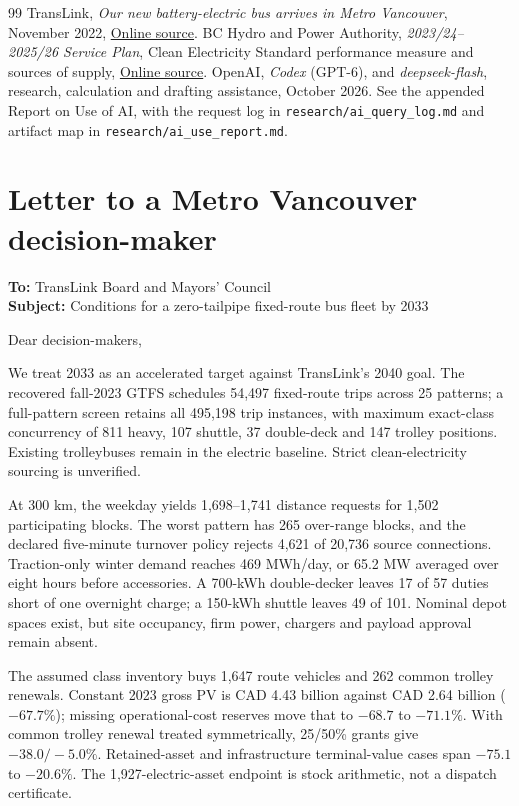 \documentclass[12pt,letterpaper]{article}
\begin{document}
\begin{thebibliography}{99}
 TransLink, \emph{Our new battery-electric bus arrives in Metro Vancouver}, November 2022, \href{https://buzzer.translink.ca/2022/11/our-new-battery-electric-bus-arrives-in-metro-vancouver/}{Online source}.
 BC Hydro and Power Authority, \emph{2023/24--2025/26 Service Plan}, Clean Electricity Standard performance measure and sources of supply, \href{https://www.bcbudget.gov.bc.ca/2023/sp/pdf/agency/bchydro.pdf}{Online source}.
 OpenAI, \emph{Codex} (GPT-6), and \emph{deepseek-flash}, research, calculation and drafting assistance, October 2026. See the appended Report on Use of AI, with the request log in \nolinkurl{research/ai_query_log.md} and artifact map in \nolinkurl{research/ai_use_report.md}.
\end{thebibliography}

\newpage
{}
\section*{Letter to a Metro Vancouver decision-maker}
\textbf{To:} TransLink Board and Mayors' Council\\
\textbf{Subject:} Conditions for a zero-tailpipe fixed-route bus fleet by 2033

Dear decision-makers,

We treat 2033 as an accelerated target against TransLink's 2040 goal. The recovered fall-2023 GTFS schedules 54,497 fixed-route trips across 25 patterns; a full-pattern screen retains all 495,198 trip instances, with maximum exact-class concurrency of 811 heavy, 107 shuttle, 37 double-deck and 147 trolley positions. Existing trolleybuses remain in the electric baseline. Strict clean-electricity sourcing is unverified.

At 300 km, the weekday yields 1,698--1,741 distance requests for 1,502 participating blocks. The worst pattern has 265 over-range blocks, and the declared five-minute turnover policy rejects 4,621 of 20,736 source connections. Traction-only winter demand reaches 469 MWh/day, or 65.2 MW averaged over eight hours before accessories. A 700-kWh double-decker leaves 17 of 57 duties short of one overnight charge; a 150-kWh shuttle leaves 49 of 101. Nominal depot spaces exist, but site occupancy, firm power, chargers and payload approval remain absent.

The assumed class inventory buys 1,647 route vehicles and 262 common trolley renewals. Constant 2023 gross PV is CAD 4.43 billion against CAD 2.64 billion ($-67.7\%$); missing operational-cost reserves move that to $-68.7$ to $-71.1\%$. With common trolley renewal treated symmetrically, 25/50\% grants give $-38.0/-5.0\%$. Retained-asset and infrastructure terminal-value cases span $-75.1$ to $-20.6\%$. The 1,927-electric-asset endpoint is stock arithmetic, not a dispatch certificate.
\end{document}
